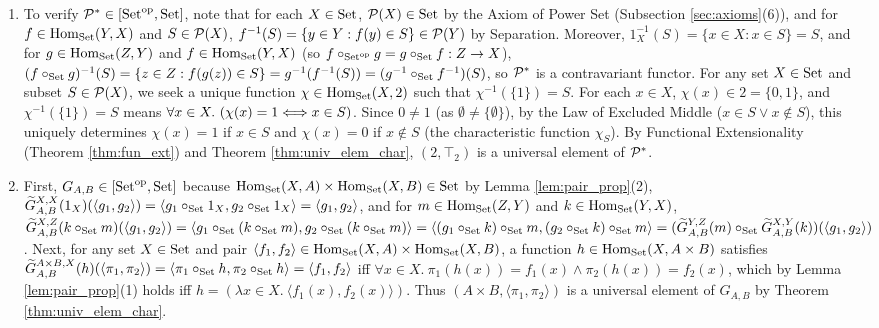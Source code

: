 \documentclass[10pt,a4paper]{article}
\begin{document}
\begin{enumerate}
\item To verify ${\mathcal{P}}^* \in [{\textrm{Set}}^{\textrm{op}}, {\textrm{Set}}]$, note that for each $X \in {\textrm{Set}}$, ${\mathcal{P}}(X) \in {\textrm{Set}}$ by the Axiom of Power Set (Subsection \ref{sec:axioms}(6)), and for $f \in {\textrm{Hom}}_{\textrm{Set}}(Y, X)$ and $S \in {\mathcal{P}}(X)$, $f^{-1}(S) = \{y \in Y : f(y) \in S\} \in {\mathcal{P}}(Y)$ by Separation. Moreover, $1_X^{-1}(S) = \{x \in X : x \in S\} = S$, and for $g \in {\textrm{Hom}}_{\textrm{Set}}(Z, Y)$ and $f \in {\textrm{Hom}}_{\textrm{Set}}(Y, X)$ (so $f \circ_{{\textrm{Set}}^{\textrm{op}}} g = g \circ_{\textrm{Set}} f : Z \to X$), $(f \circ_{\textrm{Set}} g)^{-1}(S) = \{z \in Z : f(g(z)) \in S\} = g^{-1}(f^{-1}(S)) = (g^{-1} \circ_{\textrm{Set}} f^{-1})(S)$, so ${\mathcal{P}}^*$ is a contravariant functor. For any set $X \in {\textrm{Set}}$ and subset $S \in {\mathcal{P}}(X)$, we seek a unique function $\chi \in {\textrm{Hom}}_{\textrm{Set}}(X, 2)$ such that $\chi^{-1}(\{1\}) = S$. For each $x \in X$, $\chi(x) \in 2 = \{0, 1\}$, and $\chi^{-1}(\{1\}) = S$ means $\forall x \in X.\ (\chi(x) = 1 \Longleftrightarrow x \in S)$. Since $0 \neq 1$ (as $\emptyset \neq \{\emptyset\}$), by the Law of Excluded Middle ($x \in S \lor x \notin S$), this uniquely determines $\chi(x) = 1$ if $x \in S$ and $\chi(x) = 0$ if $x \notin S$ (the characteristic function $\chi_S$). By Functional Extensionality (Theorem \ref{thm:fun_ext}) and Theorem \ref{thm:univ_elem_char}, $(2, \top_2)$ is a universal element of ${\mathcal{P}}^*$.
\item First, $G_{A,B} \in [{\textrm{Set}}^{\textrm{op}}, {\textrm{Set}}]$ because ${\textrm{Hom}}_{\textrm{Set}}(X, A) \times {\textrm{Hom}}_{\textrm{Set}}(X, B) \in {\textrm{Set}}$ by Lemma \ref{lem:pair_prop}(2), $\widetilde{G}_{A,B}^{X,X}(1_X)(\langle g_1, g_2 \rangle) = \langle g_1 \circ_{\textrm{Set}} 1_X, g_2 \circ_{\textrm{Set}} 1_X \rangle = \langle g_1, g_2 \rangle$, and for $m \in {\textrm{Hom}}_{\textrm{Set}}(Z, Y)$ and $k \in {\textrm{Hom}}_{\textrm{Set}}(Y, X)$, $\widetilde{G}_{A,B}^{X,Z}(k \circ_{\textrm{Set}} m)(\langle g_1, g_2 \rangle) = \langle g_1 \circ_{\textrm{Set}} (k \circ_{\textrm{Set}} m), g_2 \circ_{\textrm{Set}} (k \circ_{\textrm{Set}} m) \rangle = \langle (g_1 \circ_{\textrm{Set}} k) \circ_{\textrm{Set}} m, (g_2 \circ_{\textrm{Set}} k) \circ_{\textrm{Set}} m \rangle = (\widetilde{G}_{A,B}^{Y,Z}(m) \circ_{\textrm{Set}} \widetilde{G}_{A,B}^{X,Y}(k))(\langle g_1, g_2 \rangle)$. Next, for any set $X \in {\textrm{Set}}$ and pair $\langle f_1, f_2 \rangle \in {\textrm{Hom}}_{\textrm{Set}}(X, A) \times {\textrm{Hom}}_{\textrm{Set}}(X, B)$, a function $h \in {\textrm{Hom}}_{\textrm{Set}}(X, A \times B)$ satisfies $\widetilde{G}_{A,B}^{A \times B, X}(h)(\langle \pi_1, \pi_2 \rangle) = \langle \pi_1 \circ_{\textrm{Set}} h, \pi_2 \circ_{\textrm{Set}} h \rangle = \langle f_1, f_2 \rangle$ iff $\forall x \in X.\ \pi_1(h(x)) = f_1(x) \land \pi_2(h(x)) = f_2(x)$, which by Lemma \ref{lem:pair_prop}(1) holds iff $h = (\lambda x \in X.\ \langle f_1(x), f_2(x) \rangle)$. Thus $(A \times B, \langle \pi_1, \pi_2 \rangle)$ is a universal element of $G_{A,B}$ by Theorem \ref{thm:univ_elem_char}.
\end{enumerate}
\myqed
\end{document}
